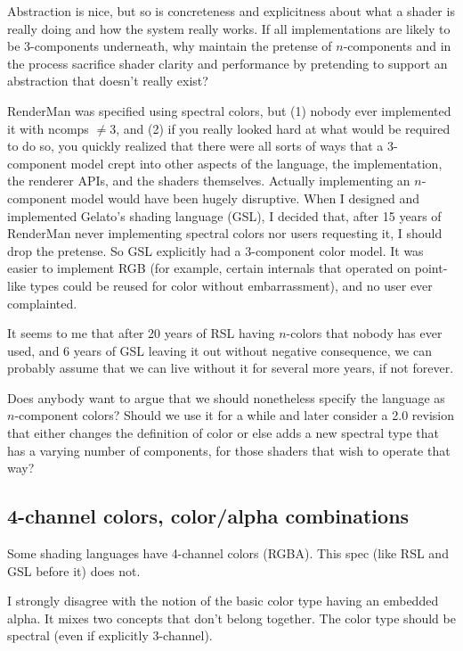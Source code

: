 \documentclass[11pt,letterpaper]{book}
\def\color{{\cf color}\xspace}
\def\point{{\cf point}\xspace}
\begin{document}
\begin{annotate}
Abstraction is nice, but so is concreteness and explicitness about what
a shader is really doing and how the system really works.  If all
implementations are likely to be 3-components underneath, why maintain
the pretense of $n$-components and in the process sacrifice shader
clarity and performance by pretending to support an abstraction that
doesn't really exist?

RenderMan was specified using spectral colors, but (1) nobody ever
implemented it with ncomps $\ne 3$, and (2) if you really looked hard at
what would be required to do so, you quickly realized that there were
all sorts of ways that a 3-component model crept into other aspects of
the language, the implementation, the renderer APIs, and the shaders
themselves.  Actually implementing an $n$-component model would have
been hugely disruptive.  When I designed and implemented Gelato's
shading language (GSL), I decided that, after 15 years of RenderMan
never implementing spectral colors nor users requesting it, I should
drop the pretense.  So GSL explicitly had a 3-component color model.  It
was easier to implement RGB (for example, certain internals that
operated on \point-like types could be reused for \color without
embarrassment), and no user ever complainted.

It seems to me that after 20 years of RSL having $n$-colors that nobody
has ever used, and 6 years of GSL leaving it out without negative
consequence, we can probably assume that we can live without it for
several more years, if not forever.

Does anybody want to argue that we should nonetheless specify the
language as $n$-component colors?  Should we use it for a while and
later consider a 2.0 revision that either changes the definition of
\color or else adds a new {\cf spectral} type that has a varying
number of components, for those shaders that wish to operate that way?


\subsection{4-channel colors, color/alpha combinations}

Some shading languages have 4-channel colors (RGBA).  This spec
(like RSL and GSL before it) does not.

I strongly disagree with the notion of the basic \color type having an
embedded alpha.  It mixes two concepts that don't belong together.  The
\color type should be spectral (even if explicitly 3-channel).


\end{annotate}
\end{document}
